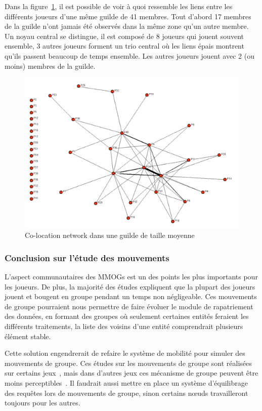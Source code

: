 \par Dans la figure~\ref{co-location}, il est possible de voir à quoi ressemble les liens entre les différents joueurs d'une même guilde de 41 membres. Tout d'abord 17 membres de la guilde n'ont jamais été observés dans la même zone qu'un autre membre. Un noyau central se distingue, il est composé de 8 joueurs qui jouent souvent ensemble, 3 autres joueurs forment un trio central où les liens épais montrent qu'ils passent beaucoup de temps ensemble. Les autres joueurs jouent avec 2 (ou moins) membres de la guilde.
	 \begin{figure}[!h]
        \centering
        \includegraphics[scale=0.75]{./Ressources/Images/co-location.png}
        \caption{Co-location network dans une guilde de taille moyenne}
        \label{co-location}
        \end{figure}

\subsubsection{Conclusion sur l'étude des mouvements}
L'aspect communautaires des MMOGs est un des points les plus importants pour les joueurs. De plus, la majorité des études expliquent que la plupart des joueurs jouent et bougent en groupe pendant un temps non négligeable. Ces mouvements de groupe pourraient nous permettre de faire évoluer le module de rapatriement des données, en formant des groupes où seulement certaines entités feraient les différents traitements, la liste des voisins d'une entité comprendrait plusieurs élément stable.
\par Cette solution engendrerait de refaire le système de mobilité pour simuler des mouvements de groupe. Ces études sur les mouvements de groupe sont réalisées sur certains jeux~\cite{wow,everquest}, mais dans d'autres jeux ces mécanisme de groupe peuvent être moins perceptibles~\cite{sl}. Il faudrait aussi mettre en place un système d'équilibrage des requêtes lors de mouvements de groupe, sinon certains nœuds travailleront toujours pour les autres.


